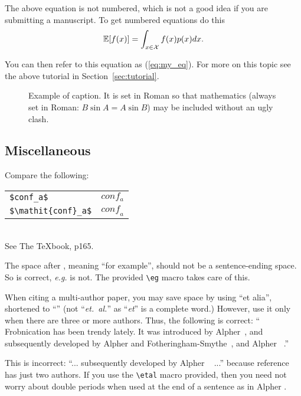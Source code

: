 \documentclass[10pt,twocolumn,letterpaper]{article}
\begin{document}
The above equation is not numbered, which is not a good idea if you are submitting a manuscript.  To get numbered equations do this
\begin{equation}\label{eq:my_eq}
	\mathbb{E}[f(x)] = \int_{x \in {\cal X}} f(x) p(x) dx.
\end{equation}

You can then refer to this equation as (\ref{eq:my_eq}).  For more on this topic see the above tutorial in Section~\ref{sec:tutorial}.


\begin{figure}[t]
\begin{center}
\fbox{\rule{0pt}{2in} \rule{0.9\linewidth}{0pt}}
\end{center}
   \caption{Example of caption.  It is set in Roman so that mathematics
   (always set in Roman: $B \sin A = A \sin B$) may be included without an
   ugly clash.}
\label{fig:long}
\label{fig:onecol}
\end{figure}

\subsection{Miscellaneous}

\noindent
Compare the following:\\
\begin{tabular}{ll}
 \verb'$conf_a$' &  $conf_a$ \\
 \verb'$\mathit{conf}_a$' & $\mathit{conf}_a$
\end{tabular}\\
See The \TeX book, p165.

The space after \eg, meaning ``for example'', should not be a sentence-ending space. So \eg is correct, {\em e.g.} is not. The provided \verb'\eg' macro takes care of this.

When citing a multi-author paper, you may save space by using ``et alia'', shortened to ``\etal'' (not ``{\em et.\ al.}'' as ``{\em et}'' is a complete word.) However, use it only when there are three or more authors. Thus, the following is correct: ``
   Frobnication has been trendy lately.
   It was introduced by Alpher~\cite{Alpher02}, and subsequently developed by
   Alpher and Fotheringham-Smythe~\cite{Alpher03}, and Alpher \etal~\cite{Alpher04}.''

This is incorrect: ``... subsequently developed by Alpher \etal~\cite{Alpher03} ...'' because reference~\cite{Alpher03} has just two authors. If you use the \verb'\etal' macro provided, then you need not worry about double periods when used at the end of a sentence as in Alpher \etal.
\end{document}
